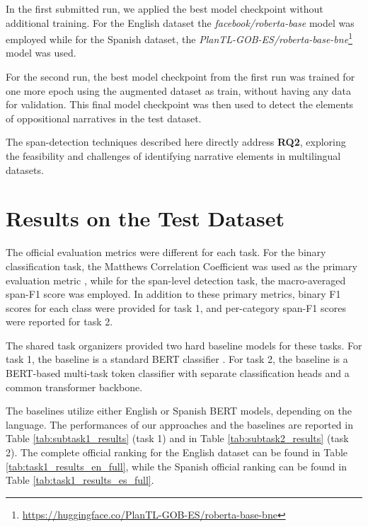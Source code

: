 \documentclass{Configuration_Files/PoliMi3i_thesis}
\begin{document}
In the first submitted run, we applied the best model checkpoint without additional training. For the English dataset the \textit{facebook/roberta-base}%
model was employed while for the Spanish dataset, the \textit{PlanTL-GOB-ES/roberta-base-bne}\footnote{\url{https://huggingface.co/PlanTL-GOB-ES/roberta-base-bne}} \cite{gutierrez2022maria} model was used. 

For the second run, the best model checkpoint from the first run was trained for one more epoch using the augmented dataset as train, without having any data for validation. This final model checkpoint was then used to detect the elements of oppositional narratives in the test dataset. 

The span-detection techniques described here directly address \textbf{RQ2}, exploring the feasibility and challenges of identifying narrative elements in multilingual datasets.



\chapter{Results on the Test Dataset} \label{chap:results_test_dataset}
The official evaluation metrics were different for each task. For the binary classification task, the Matthews Correlation Coefficient was used as the primary evaluation metric \cite{chicco2020advantages}, while for the span-level detection task, the macro-averaged span-F1 \cite{da2020semeval} score was employed. In addition to these primary metrics, binary F1 scores for each class were provided for task 1, and per-category span-F1 scores were reported for task 2.

\noindent The shared task organizers provided two hard baseline models for these tasks. For task 1, the baseline is a standard BERT classifier \cite{devlin-etal-2019-bert}. For task 2, the baseline is a BERT-based multi-task token classifier with separate classification heads and a common transformer backbone. 

The baselines utilize either English or Spanish BERT models, depending on the language. The performances of our approaches and the baselines are reported in Table \ref{tab:subtask1_results} (task 1) and in Table \ref{tab:subtask2_results} (task 2). The complete official ranking \cite{korencic2024oppositional} for the English dataset can be found in Table \ref{tab:task1_results_en_full}, while the Spanish official ranking can be found in Table \ref{tab:task1_results_es_full}.
\end{document}

